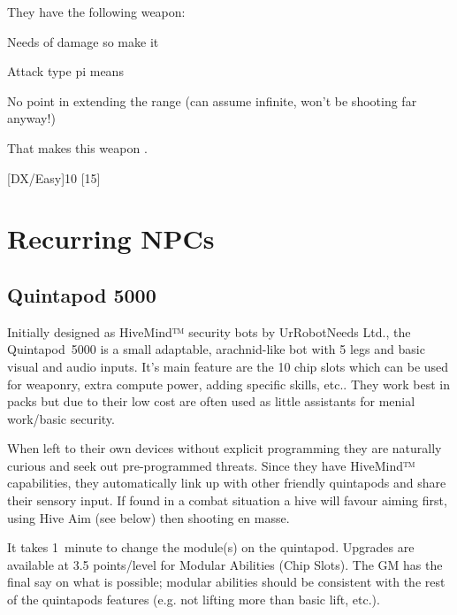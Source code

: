 They have the following weapon:
\begin{innateattack}
  \item Needs  of damage so make it 
  \item Attack type pi means 
  \item No point in extending the range (can assume infinite, won't be shooting
    far anyway!)
  \item That makes this weapon \InnateAttackTotalPoints.
\end{innateattack}

\begin{character}
  [DX/Easy]{10}
  [15]
\end{character}


\chapter{Recurring NPCs}
\label{cha:recurring-npcs}

\section{Quintapod 5000}
\label{sec:quintapod-5000}

Initially designed as HiveMind™ security bots by UrRobotNeeds Ltd., the
Quintapod~5000 is a small adaptable, arachnid-like bot with 5 legs and basic
visual and audio inputs. It's main feature are the 10 chip slots which can be
used for weaponry, extra compute power, adding specific skills, etc.. They work
best in packs but due to their low cost are often used as little assistants for
menial work/basic security.

When left to their own devices without explicit programming they are naturally
curious and seek out pre-programmed threats. Since they have HiveMind™
capabilities, they automatically link up with other friendly quintapods and
share their sensory input. If found in a combat situation a hive will favour
aiming first, using Hive Aim (see below) then shooting en masse.

It takes 1~minute to change the module(s) on the quintapod. Upgrades are
available at 3.5 points/level for Modular Abilities (Chip Slots). The GM has
the final say on what is possible; modular abilities should be consistent with
the rest of the quintapods features (e.g. not lifting more than basic lift,
etc.).


